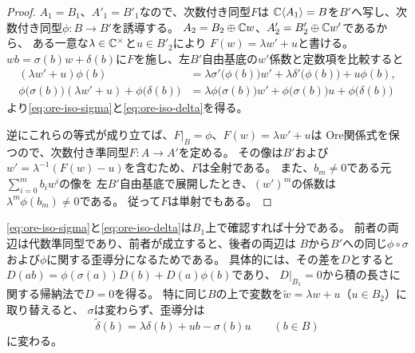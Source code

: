 \begin{proof}
$A_1=B_1$、$A'_1=B'_1$なので、次数付き同型$F$は
$\mathbb C\langle A_1\rangle=B$を$B'$へ写し、次数付き同型$\phi:B\to B'$を誘導する。
$A_2=B_2\oplus\mathbb C w$、$A'_2=B'_2\oplus\mathbb C w'$であるから、
ある一意な$\lambda\in\mathbb C^\times$と$u\in B'_2$により
$F(w)=\lambda w'+u$と書ける。
$wb=\sigma(b)w+\delta(b)$に$F$を施し、左$B'$自由基底の$w'$係数と定数項を比較すると
\begin{align*}
  (\lambda w'+u)\phi(b)
   &=\lambda\sigma'\bigl(\phi(b)\bigr)w'
     +\lambda\delta'\bigl(\phi(b)\bigr)+u\phi(b),\\
  \phi\bigl(\sigma(b)\bigr)(\lambda w'+u)+\phi\bigl(\delta(b)\bigr)
   &=\lambda\phi\bigl(\sigma(b)\bigr)w'
     +\phi\bigl(\sigma(b)\bigr)u+\phi\bigl(\delta(b)\bigr)
\end{align*}
より\eqref{eq:ore-iso-sigma}と\eqref{eq:ore-iso-delta}を得る。

逆にこれらの等式が成り立てば、$F|_B=\phi$、$F(w)=\lambda w'+u$は
Ore関係式を保つので、次数付き準同型$F:A\to A'$を定める。
その像は$B'$および$w'=\lambda^{-1}(F(w)-u)$を含むため、$F$は全射である。
また、$b_m\ne0$である元$\sum_{i=0}^{m}b_iw^i$の像を
左$B'$自由基底で展開したとき、$(w')^m$の係数は
$\lambda^m\phi(b_m)\ne0$である。
従って$F$は単射でもある。
\end{proof}

\eqref{eq:ore-iso-sigma}と\eqref{eq:ore-iso-delta}は$B_1$上で確認すれば十分である。
前者の両辺は代数準同型であり、前者が成立すると、後者の両辺は
$B$から$B'$への同じ$\phi\circ\sigma$および$\phi$に関する歪導分になるためである。
具体的には、その差を$D$とすると
$D(ab)=\phi(\sigma(a))D(b)+D(a)\phi(b)$であり、
$D|_{B_1}=0$から積の長さに関する帰納法で$D=0$を得る。
特に同じ$B$の上で変数を$\widetilde w=\lambda w+u$（$u\in B_2$）に取り替えると、
$\sigma$は変わらず、歪導分は
\[
  \widetilde\delta(b)=\lambda\delta(b)+ub-\sigma(b)u
  \qquad(b\in B)
\]
に変わる。
